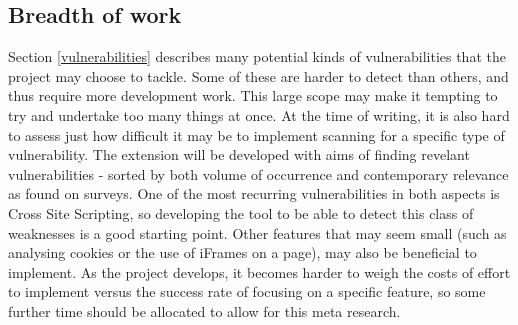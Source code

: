  \subsection{Breadth of  work}
 Section \ref{vulnerabilities} describes many potential kinds of vulnerabilities that the project may choose to tackle. Some of these are harder to detect than others, and thus require more development work. This large scope may make it tempting to try and undertake too many things at once. At the time of writing, it is also hard to assess just how difficult it may be to implement scanning for a specific type of vulnerability. The extension will be developed with aims of finding revelant vulnerabilities - sorted by both volume of occurrence and contemporary relevance as found on surveys. One of the most recurring vulnerabilities in both aspects is Cross Site Scripting, so developing the tool to be able to detect this class of weaknesses is a good starting point. Other features that may seem small (such as analysing cookies or the use of iFrames on a page), may also be beneficial to implement. As the project develops, it becomes harder to weigh the costs of effort to implement versus the success rate of focusing on a specific feature, so some further time should be allocated to allow for this meta research. \\ 
 
